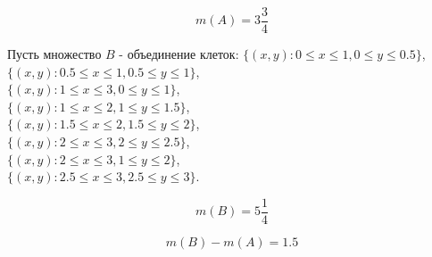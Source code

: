 \documentclass{report}
\begin{document}
\[m(A) = 3\frac{3}{4}\]

Пусть множество $B$ - объединение клеток:
$\{(x, y): 0 \leq x \leq 1, 0 \leq y \leq 0.5\}$,\\
$\{(x, y): 0.5 \leq x \leq 1, 0.5 \leq y \leq 1\}$,\\
$\{(x, y): 1 \leq x \leq 3, 0 \leq y \leq 1\}$,\\
$\{(x, y): 1 \leq x \leq 2, 1 \leq y \leq 1.5\}$,\\
$\{(x, y): 1.5 \leq x \leq 2, 1.5 \leq y \leq 2\}$,\\
$\{(x, y): 2 \leq x \leq 3, 2 \leq y \leq 2.5\}$,\\
$\{(x, y): 2 \leq x \leq 3, 1 \leq y \leq 2\}$,\\
$\{(x, y): 2.5 \leq x \leq 3, 2.5 \leq y \leq 3\}$.

\[m(B) = 5\frac{1}{4}\]

\[m(B) - m(A) = 1.5\]
\newpage
\end{document}
